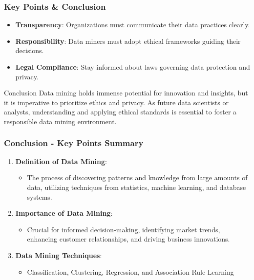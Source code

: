 \documentclass[aspectratio=169]{beamer}
\begin{document}
\begin{frame}[fragile]
  \frametitle{Key Points & Conclusion}
  \begin{itemize}
    \item \textbf{Transparency}: Organizations must communicate their data practices clearly.
    \item \textbf{Responsibility}: Data miners must adopt ethical frameworks guiding their decisions.
    \item \textbf{Legal Compliance}: Stay informed about laws governing data protection and privacy.
  \end{itemize}

  \begin{block}{Conclusion}
    Data mining holds immense potential for innovation and insights, but it is imperative to prioritize ethics and privacy. As future data scientists or analysts, understanding and applying ethical standards is essential to foster a responsible data mining environment.
  \end{block}
\end{frame}

\begin{frame}[fragile]
  \frametitle{Conclusion - Key Points Summary}
  \begin{enumerate}
    \item \textbf{Definition of Data Mining}:
      \begin{itemize}
        \item The process of discovering patterns and knowledge from large amounts of data, utilizing techniques from statistics, machine learning, and database systems.
      \end{itemize}

    \item \textbf{Importance of Data Mining}:
      \begin{itemize}
        \item Crucial for informed decision-making, identifying market trends, enhancing customer relationships, and driving business innovations.
      \end{itemize}

    \item \textbf{Data Mining Techniques}:
      \begin{itemize}
        \item Classification, Clustering, Regression, and Association Rule Learning 
      \end{itemize}
  \end{enumerate}
\end{frame}
\end{document}
